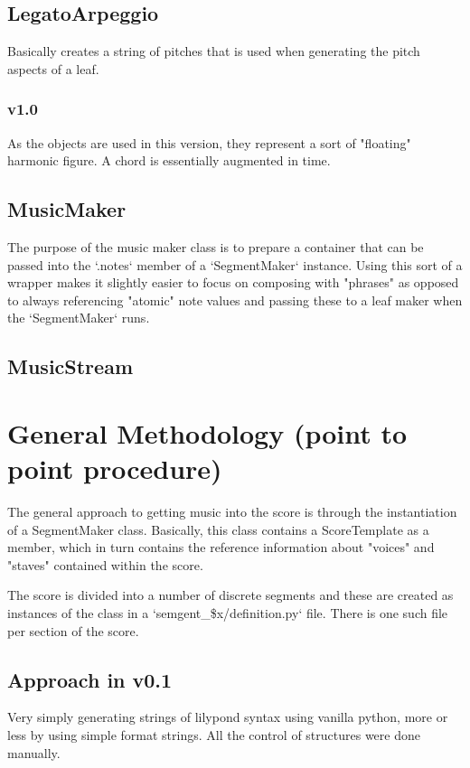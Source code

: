 \documentclass[11pt]{article}
\begin{document}
\subsection{LegatoArpeggio}
\label{sec:orgf607325}
Basically creates a string of pitches that is used when generating the
pitch aspects of a leaf.

\subsubsection{v1.0}
\label{sec:org42b2830}
As the objects are used in this version, they represent a sort of
"floating" harmonic figure. A chord is essentially augmented in time. 

\subsection{MusicMaker}
\label{sec:orgc6754d8}
The purpose of the music maker class is to prepare a container that
can be passed into the `.notes` member of a `SegmentMaker`
instance. Using this sort of a wrapper makes it slightly easier to
focus on composing with "phrases" as opposed to always referencing
"atomic" note values and passing these to a leaf maker when the
`SegmentMaker` runs. 

\subsection{MusicStream}
\label{sec:orga129853}


\section{General Methodology (point to point procedure)}
\label{sec:org9650dfa}

The general approach to getting music into the score is through the
instantiation of a SegmentMaker class. Basically, this class contains
a ScoreTemplate as a member, which in turn contains the reference information
about "voices" and "staves" contained within the score. 

The score is divided into a number of discrete segments and these are
created as instances of the class in a `semgent\_\$x/definition.py`
file. There is one such file per section of the score. 

\subsection{Approach in v0.1}
\label{sec:org56976f7}
Very simply generating strings of lilypond syntax using vanilla
python, more or less by using simple format strings. All the control
of structures were done manually.   
\end{document}
